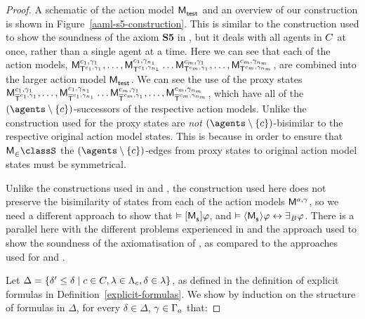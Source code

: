 \begin{proof}
A schematic of the action model $\aPModel{\aStateTest}$ and an overview of our construction is shown in Figure~\ref{aaml-s5-construction}.
This is similar to the construction used to show the soundness of the axiom {\bf S5} in \logicRmlS{}, but it deals with all agents in $\agentsC$ at once, rather than a single agent at a time.
Here we can see that each of the action models, $\aPModel[\agentC_1,\gamma_1]{\aStatesT[\agentC_1, \gamma_1]}, \dots, \aPModel[\agentC_1,\gamma_{n_1}]{\aStatesT[\agentC_1, \gamma_{n_1}]} \dots \aPModel[\agentC_m,\gamma_1]{\aStatesT[\agentC_m, \gamma_1]}, \dots, \aPModel[\agentC_m,\gamma_{n_m}]{\aStatesT[\agentC_m, \gamma_{n_m}]}$, are combined into the larger action model $\aPModel{\aStateTest}$.
We can see the use of the proxy states $\aPModel[\agentC_1,\gamma_1]{\aPStatesT[\agentC_1, \gamma_1]}, \dots, \aPModel[\agentC_1,\gamma_{n_1}]{\aPStatesT[\agentC_1, \gamma_{n_1}]} \dots \aPModel[\agentC_m,\gamma_1]{\aPStatesT[\agentC_m, \gamma_1]}, \dots, \aPModel[\agentC_m,\gamma_{n_m}]{\aPStatesT[\agentC_m, \gamma_{n_m}]}$, which have all of the $(\agents \setminus \{\agentC\})$-successors of the respective action models.
Unlike the construction used for \logicAamlKFF{} the proxy states are {\em not} $(\agents \setminus \{\agentC\})$-bisimilar to the respective original action model states.
This is because in order to ensure that $\aPModel \in \classS$ the $(\agents \setminus \{\agentC\})$-edges from proxy states to original action model states must be symmetrical.

Unlike the constructions used in \logicAamlK{} and \logicAamlKFF{}, the construction used here does not preserve the bisimilarity of states from each of the action models $\aModel[\agentA, \gamma]$, so we need a different approach to show that $\entails \actionA{\aPModel{\aStateS}} \phi$, and $\entails \actionE{\aPModel{\aStateS}} \phi \iff \someactsBs \phi$.
There is a parallel here with the different problems experienced in \logicRmlS{} and the approach used to show the soundness of the axiomatisation of \logicRmlS{}, as compared to the approaches used for \logicRmlK{} and \logicRmlKFF{}.

Let $\Delta = \{\delta' \leq \delta \mid \agentC \in \agentsC, \lambda \in \Lambda_\agentC, \delta \in \lambda\}$, as defined in the definition of explicit formulas in Definition~\ref{explicit-formulas}.
We show by induction on the structure of formulas in $\Delta$, for every $\delta \in \Delta$, $\gamma \in \Gamma_\agentA$ that:


\end{proof}
